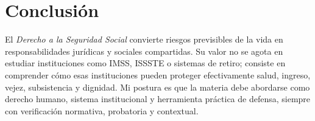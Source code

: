 \documentclass[
  spanish,
  letterpaper, oneside
]{article}
\begin{document}
\section{Conclusión}

El \textit{Derecho a la Seguridad Social} convierte riesgos previsibles de la vida en responsabilidades jurídicas y sociales compartidas. Su valor no se agota en estudiar instituciones como IMSS, ISSSTE o sistemas de retiro; consiste en comprender cómo esas instituciones pueden proteger efectivamente salud, ingreso, vejez, subsistencia y dignidad. Mi postura es que la materia debe abordarse como derecho humano, sistema institucional y herramienta práctica de defensa, siempre con verificación normativa, probatoria y contextual.

\clearpage
\nocite{unadmSitioWeb,unadmMallaDerecho2024,cpeum2026,lss2026,lissste2026,imssSitio2026,isssteSitio2026,consarSitio2026}

\end{document}
